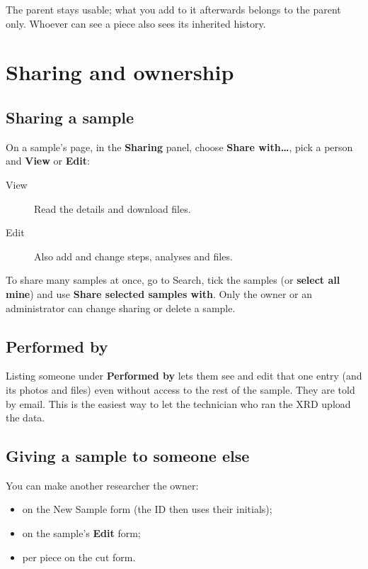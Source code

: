 \documentclass[11pt,a4paper]{article}
\newcommand{\ui}[1]{\textsf{\textbf{#1}}}
\newcommand{\menu}[1]{\textsf{#1}}
\begin{document}
The parent stays usable; what you add to it afterwards belongs to the
parent only. Whoever can see a piece also sees its inherited history.

\section{Sharing and ownership}

\subsection{Sharing a sample}

On a sample's page, in the \ui{Sharing} panel, choose \ui{Share with\ldots},
pick a person and \ui{View} or \ui{Edit}:

\begin{description}
  \item[View] Read the details and download files.
  \item[Edit] Also add and change steps, analyses and files.
\end{description}

To share many samples at once, go to \menu{Search}, tick the samples (or
\ui{select all mine}) and use \ui{Share selected samples with}. Only the
owner or an administrator can change sharing or delete a sample.

\subsection{Performed by}

Listing someone under \ui{Performed by} lets them see and edit that one
entry (and its photos and files) even without access to the rest of the
sample. They are told by email. This is the easiest way to let the
technician who ran the XRD upload the data.

\subsection{Giving a sample to someone else}
\label{sec:assign}

You can make another researcher the owner:
\begin{itemize}
  \item on the \menu{New Sample} form (the ID then uses their initials);
  \item on the sample's \ui{Edit} form;
  \item per piece on the cut form.
\end{itemize}
\end{document}
